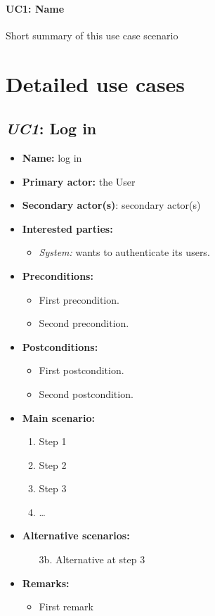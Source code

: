 \documentclass[english,peerreview]{sareport}
\begin{document}
\paragraph{UC1: Name}
Short summary of this use case scenario

\section{Detailed use cases}
\subsection{\emph{UC1}: Log in}
\begin{itemize}
    \item \textbf{Name:} log in
    \item \textbf{Primary actor:} the User
    \item \textbf{Secondary actor(s)}: secondary actor(s)
    \item \textbf{Interested parties:} 
        \begin{itemize}
            \item \textit{System:} wants to authenticate its users.
        \end{itemize}

    \item \textbf{Preconditions:}
        \begin{itemize}
            \item First precondition.
            \item Second precondition.
        \end{itemize}

    \item \textbf{Postconditions:}
        \begin{itemize}
            \item First postcondition.
            \item Second postcondition.
        \end{itemize}
        
    \item \textbf{Main scenario:} 
    \begin{enumerate}
       \item Step 1
       \item Step 2
       \item Step 3
       \item \ldots
    \end{enumerate}

    \item \textbf{Alternative scenarios:} 
    \begin{enumerate}
        \item [3b.] Alternative at step 3
    \end{enumerate}
    
    \item \textbf{Remarks:}
        \begin{itemize}
            \item First remark
        \end{itemize}
\end{itemize}
\end{document}
